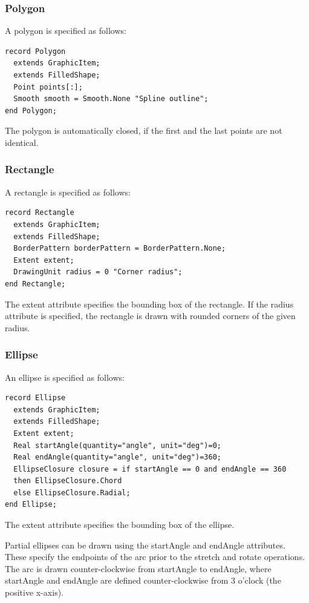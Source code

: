 \documentclass[10pt,a4paper]{report}
\def\doublelabel#1{\label{#1}}
\begin{document}
\subsubsection{Polygon}\doublelabel{polygon}

A polygon is specified as follows:

\begin{lstlisting}[language=modelica]
record Polygon
  extends GraphicItem;
  extends FilledShape;
  Point points[:];
  Smooth smooth = Smooth.None "Spline outline";
end Polygon;
\end{lstlisting}
The polygon is automatically closed, if the first and the last points
are not identical.

\subsubsection{Rectangle}\doublelabel{rectangle}

A rectangle is specified as follows:

\begin{lstlisting}[language=modelica]
record Rectangle
  extends GraphicItem;
  extends FilledShape;
  BorderPattern borderPattern = BorderPattern.None;
  Extent extent;
  DrawingUnit radius = 0 "Corner radius";
end Rectangle;
\end{lstlisting}
The extent attribute specifies the bounding box of the rectangle. If the
radius attribute is specified, the rectangle is drawn with rounded
corners of the given radius.

\subsubsection{Ellipse}\doublelabel{ellipse}

An ellipse is specified as follows:

\begin{lstlisting}[language=modelica]
record Ellipse
  extends GraphicItem;
  extends FilledShape;
  Extent extent;
  Real startAngle(quantity="angle", unit="deg")=0;
  Real endAngle(quantity="angle", unit="deg")=360;
  EllipseClosure closure = if startAngle == 0 and endAngle == 360
  then EllipseClosure.Chord
  else EllipseClosure.Radial;
end Ellipse;
\end{lstlisting}
The extent attribute specifies the bounding box of the ellipse.

Partial ellipses can be drawn using the startAngle and endAngle
attributes. These specify the endpoints of the arc prior to the stretch
and rotate operations. The arc is drawn counter-clockwise from
startAngle to endAngle, where startAngle and endAngle are defined
counter-clockwise from 3 o'clock (the positive x-axis).
\end{document}
